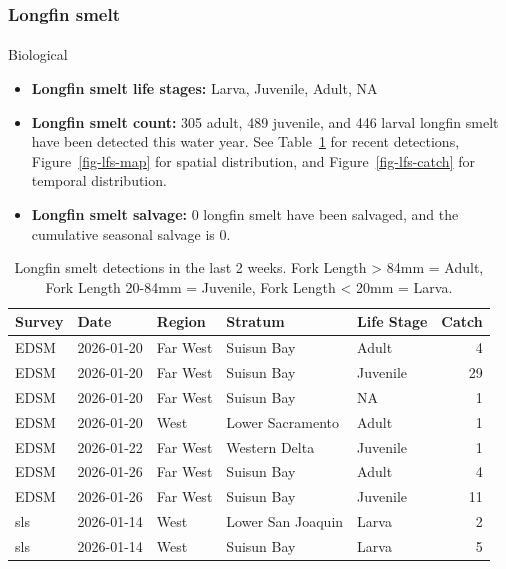 \documentclass[
  letterpaper,
  DIV=11,
  numbers=noendperiod]{scrartcl}
\makeatletter
\let\oldparagraph\paragraph
\renewcommand{\paragraph}{
    \@ifstar
      \xxxParagraphStar
      \xxxParagraphNoStar
  }
\newcommand{\xxxParagraphStar}[1]{\oldparagraph*{#1}\mbox{}}
\newcommand{\xxxParagraphNoStar}[1]{\oldparagraph{#1}\mbox{}}
\makeatother
\begin{document}
\subsubsection{Longfin smelt}\label{longfin-smelt}

\paragraph{Biological}\label{biological-1}

\begin{itemize}
\item
  \textbf{Longfin smelt life stages:} Larva, Juvenile, Adult, NA
\item
  \textbf{Longfin smelt count:} 305 adult, 489 juvenile, and 446 larval
  longfin smelt have been detected this water year. See
  Table~\ref{tbl-lfs-recent-catch} for recent detections,
  Figure~\ref{fig-lfs-map} for spatial distribution, and
  Figure~\ref{fig-lfs-catch} for temporal distribution.
\item
  \textbf{Longfin smelt salvage:} 0 longfin smelt have been salvaged,
  and the cumulative seasonal salvage is 0.
\end{itemize}

\begin{longtable}[]{@{}lllllr@{}}

\caption{\label{tbl-lfs-recent-catch}Longfin smelt detections in the
last 2 weeks. Fork Length \textgreater{} 84mm = Adult, Fork Length
20-84mm = Juvenile, Fork Length \textless{} 20mm = Larva.}

\tabularnewline

\toprule\noalign{}
Survey & Date & Region & Stratum & Life Stage & Catch \\
\midrule\noalign{}
\endhead
\bottomrule\noalign{}
\endlastfoot
EDSM & 2026-01-20 & Far West & Suisun Bay & Adult & 4 \\
EDSM & 2026-01-20 & Far West & Suisun Bay & Juvenile & 29 \\
EDSM & 2026-01-20 & Far West & Suisun Bay & NA & 1 \\
EDSM & 2026-01-20 & West & Lower Sacramento & Adult & 1 \\
EDSM & 2026-01-22 & Far West & Western Delta & Juvenile & 1 \\
EDSM & 2026-01-26 & Far West & Suisun Bay & Adult & 4 \\
EDSM & 2026-01-26 & Far West & Suisun Bay & Juvenile & 11 \\
sls & 2026-01-14 & West & Lower San Joaquin & Larva & 2 \\
sls & 2026-01-14 & West & Suisun Bay & Larva & 5 \\

\end{longtable}
\end{document}
